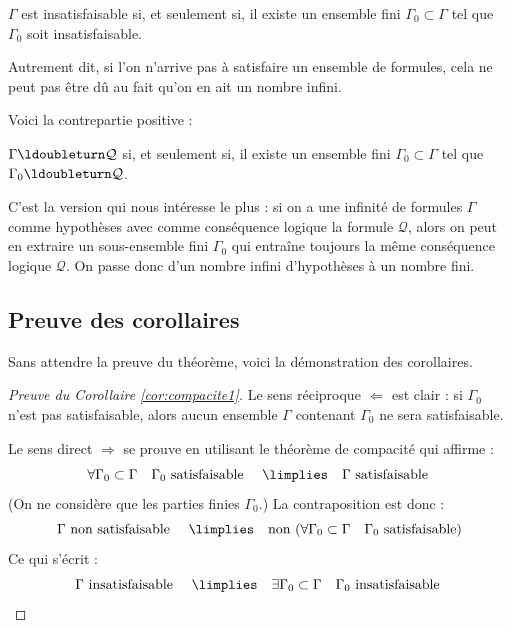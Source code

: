 \documentclass[11pt,class=report,crop=false]{standalone}
\begin{document}
\begin{corollaire}
	\label{cor:compacite1}	
	$\Gamma$ est insatisfaisable si, et seulement si, il existe un ensemble fini $\Gamma_0 \subset \Gamma$ tel que $\Gamma_0$ soit insatisfaisable.
\end{corollaire}

Autrement dit, si l'on n'arrive pas à satisfaire un ensemble de formules, cela ne peut pas être dû au fait qu'on en ait un nombre infini.

Voici la contrepartie positive :
\begin{corollaire}
	\label{cor:compacite2}
	$\Gamma \ldoubleturn \mathcal{Q}$ si, et seulement si, il existe un ensemble fini $\Gamma_0 \subset \Gamma$ tel que $\Gamma_0 \ldoubleturn \mathcal{Q}$.
\end{corollaire}

C'est la version qui nous intéresse le plus :
si on a une infinité de formules $\Gamma$ comme hypothèses avec comme conséquence logique la formule $\mathcal{Q}$, alors on peut en extraire un sous-ensemble fini $\Gamma_0$ qui entraîne toujours la même conséquence logique $\mathcal{Q}$.
On passe donc d'un nombre infini d'hypothèses à un nombre fini.


\subsection{Preuve des corollaires}

Sans attendre la preuve du théorème, voici la démonstration des corollaires.

\begin{proof}[Preuve du Corollaire \ref{cor:compacite1}]
	
	Le sens réciproque $\Leftarrow$ est clair : si $\Gamma_0$ n'est pas satisfaisable, alors aucun ensemble $\Gamma$ contenant $\Gamma_0$ ne sera satisfaisable.
	
	
	Le sens direct $\Rightarrow$ se prouve en utilisant le théorème de compacité qui affirme :
	\[
	\forall \Gamma_0 \subset \Gamma  \quad \Gamma_0 \text{ satisfaisable } 
	\quad \limplies \quad \Gamma \text{ satisfaisable }
	\]
	(On ne considère que les parties finies $\Gamma_0$.)
	La contraposition est donc :
	\[
	 \Gamma \text{ non satisfaisable }
	 \quad \limplies \quad
	\text{non} \  (\forall \Gamma_0 \subset \Gamma \quad \Gamma_0 \text{ satisfaisable}) 
	\]
	Ce qui s'écrit :
\[
\Gamma \text{ insatisfaisable }
\quad \limplies \quad
\exists \Gamma_0 \subset \Gamma \quad \Gamma_0 \text{ insatisfaisable } 
\]	
\end{proof}
\end{document}

